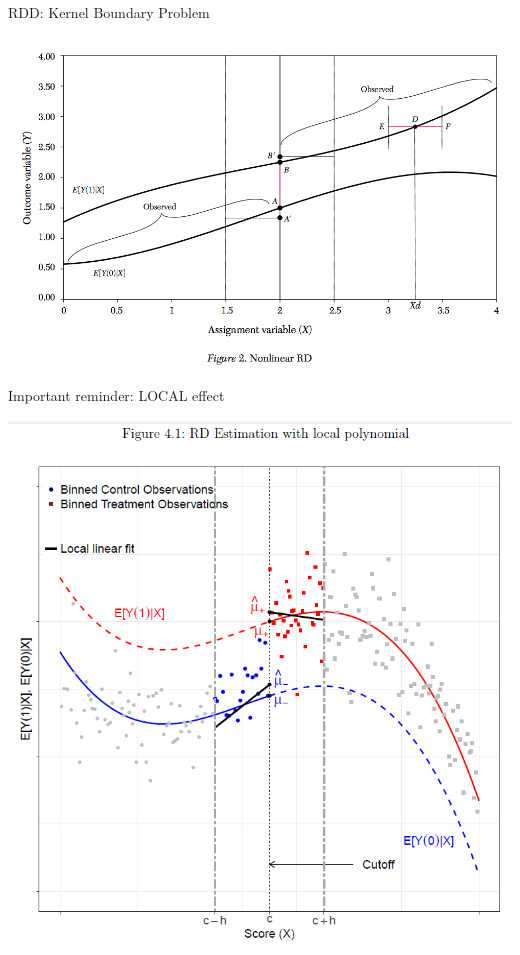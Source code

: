 \begin{frame}{RDD: Kernel Boundary Problem}
\begin{center}
\includegraphics[height=0.8\textheight]{./resources/ll-fig2}
\end{center}
\end{frame}

\begin{frame}{Important reminder: LOCAL effect}
  \begin{center}
  \includegraphics[height=0.8\textheight]{./resources/CatteneoLocpoly}
  \end{center}
\end{frame}

